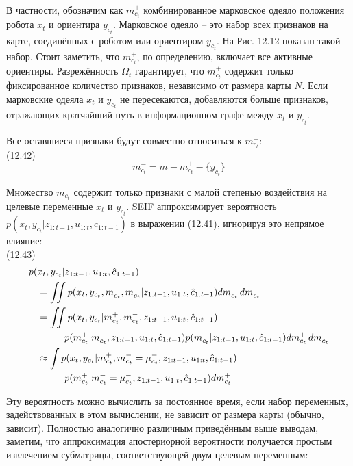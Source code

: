 \documentclass[10pt,a4paper]{article}
\begin{document}
В частности, обозначим как $m_{c_t}^+$ комбинированное марковское одеяло положения робота $x_t$  и ориентира $y_{c_t}$.   Марковское одеяло – это набор всех признаков на карте, соединённых с роботом или ориентиром $y_{c_t}$. На Рис. 12.12 показан такой набор. Стоит заметить, что $m_{c_t}^+$,  по определению, включает все активные ориентиры.  Разрежённость $\bar{\varOmega}_t$ гарантирует, что $m_{c_t}^+$ содержит только фиксированное количество признаков, независимо от размера карты $N$. Если марковские одеяла $x_t$ и $y_{c_t}$ не пересекаются, добавляются больше признаков, отражающих кратчайший путь в информационном графе между $x_t$ и $y_{c_t}$.

Все оставшиеся признаки будут совместно относиться к $m_{c_t}^-$:\\

(12.42)
$$m_{c_t}^-=m-m_{c_t}^+-\{y_{c_t}\}$$

Множество $m_{c_t}^-$ содержит только признаки с малой степенью воздействия на целевые переменные $x_t$ и $y_{c_t}$.  SEIF аппроксимирует вероятность $p(x_t, y_{c_t}|z_{1:t-1}, u_{1:t}, \hat{c}_{1:t-1})$ в выражении (12.41), игнорируя это непрямое влияние:\\

(12.43)
\begin{equation*}
\begin{split}
p(&x_t, y_{c_t}|z_{1:t-1}, u_{1:t}, \hat{c}_{1:t-1})\\
&=\iint p(x_t, y_{c_t},m_{c_t}^+,m_{c_t}^-|z_{1:t-1}, u_{1:t}, \hat{c}_{1:t-1})dm_{c_t}^+\,dm_{c_t}^-\\
&=\iint p(x_t, y_{c_t}|m_{c_t}^+,m_{c_t}^-,z_{1:t-1}, u_{1:t}, \hat{c}_{1:t-1})\\
&\hspace{10mm} p(m_{c_t}^+|m_{c_t}^-,z_{1:t-1}, u_{1:t}, \hat{c}_{1:t-1})p(m_{c_t}^-|z_{1:t-1}, u_{1:t}, \hat{c}_{1:t-1})dm_{c_t}^+\,dm_{c_t}^-\\
&\approx\int p(x_t, y_{c_t}|m_{c_t}^+,m_{c_t}^-=\mu_{c_t}^-,z_{1:t-1}, u_{1:t}, \hat{c}_{1:t-1})\\
&\hspace{10mm}p(m_{c_t}^+|m_{c_t}^-=\mu_{c_t}^-,z_{1:t-1}, u_{1:t}, \hat{c}_{1:t-1})dm_{c_t}^+
\end{split}
\end{equation*}

Эту вероятность можно вычислить за постоянное время, если набор переменных, задействованных в этом вычислении, не зависит от размера карты (обычно, зависит). Полностью аналогично различным приведённым выше выводам, заметим, что аппроксимация апостериорной вероятности получается простым извлечением субматрицы, соответствующей двум целевым переменным:\\
\end{document}
